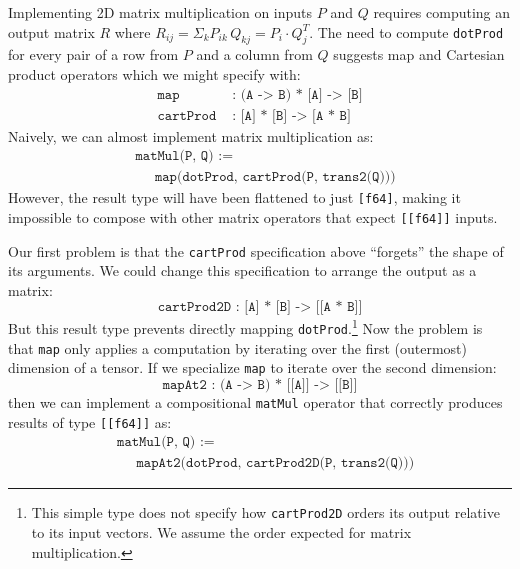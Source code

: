 \documentclass[prologue, dvipsnames, sigplan, screen, review, anonymous]{acmart}
\newcommand{\tcd}[1]{\texttt{#1}}
\newcommand{\mcd}[1]{\mathrm{\tcd{#1}}}
\begin{document}


\noindent
Implementing 2D matrix multiplication
  on inputs $P$ and $Q$ requires computing
  an output matrix $R$ where
  $R_{ij} = \Sigma_k P_{ik} \, Q_{kj}
          =  P_i \cdot Q^{T}_{j}$. %
The need to compute \tcd{dotProd} for every pair
  of a row from $P$ and a column from $Q$
  suggests map and Cartesian product operators
  which we might specify with:
\begin{align*}
    \mcd{map} &
    \mcd{ : (A -> B) * [A] -> [B]} \\
    \mcd{cartProd} &
    \mcd{ : [A] * [B] -> [A * B]}
\end{align*}
Naively, we can almost implement matrix multiplication as:
{\color{red} \begin{align*}
  & \mcd{matMul(P, Q) :=} \\
  & \;\;\;\;\; \mcd{map(dotProd, cartProd(P, trans2(Q)))}
\end{align*} }
However, the result type will have been
  flattened to just {\color{red}\tcd{[f64]}},
  making it impossible to compose with other matrix
  operators that expect \tcd{[[f64]]} inputs.

Our first problem is that
  the \tcd{cartProd} specification above
  ``forgets'' the shape of its arguments.
We could change this specification to
  arrange the output as a matrix:
$$
  \mcd{cartProd2D : [A] * [B] -> [[A * B]]}
$$
But this result type prevents
  directly mapping \tcd{dotProd}.\footnote{
    This simple type does not specify how
    \tcd{cartProd2D} orders its output
    relative to its input vectors.
    We assume the order
    expected for matrix multiplication.}
Now the problem is that \tcd{map}
  only applies a computation by iterating
  over the first (outermost) dimension of a tensor.
If we specialize \tcd{map} to iterate
  over the second dimension:
$$
  \mcd{mapAt2 : (A -> B) * [[A]] -> [[B]]}
$$
then we can implement a compositional
  \tcd{matMul} operator that correctly produces
  results of type \tcd{[[f64]]} as:
\begin{align*}
  & \mcd{matMul(P, Q) :=} \\
  & \;\;\;\;\; \mcd{mapAt2(dotProd, cartProd2D(P, trans2(Q)))}
\end{align*}
\end{document}

